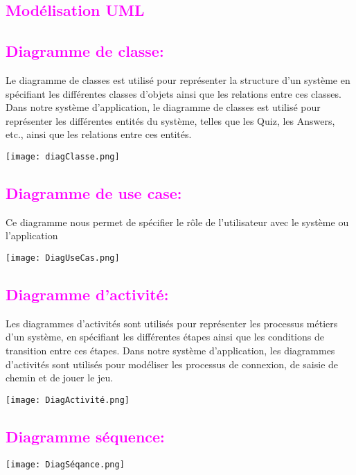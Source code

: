 \documentclass[12pt, a4paper]{report}
\begin{document}
\textcolor{magenta}{\section{ Modélisation UML}}
\textcolor{magenta}{\subsection{Diagramme de classe: }}
Le diagramme de classes est utilisé pour représenter la structure d'un système en spécifiant les différentes classes d'objets ainsi que les relations entre ces classes.\\
Dans notre système d’application, le diagramme de classes est utilisé pour représenter les différentes entités du système, telles que les Quiz, les Answers, etc., ainsi que les relations entre ces entités.
\bigskip
\begin{center}
\texttt{[image: diagClasse.png]} 
\end{center}
\textcolor{magenta}{\subsection{Diagramme de use case: }}
Ce diagramme nous permet de spécifier le rôle de l'utilisateur avec le système ou l’application
\bigskip
\begin{center}
\texttt{[image: DiagUseCas.png]} 
\end{center}
\textcolor{magenta}{\subsection{Diagramme d'activité: }}
Les diagrammes d'activités sont utilisés pour représenter les processus métiers d'un système, en spécifiant les différentes étapes ainsi que les conditions de transition entre ces étapes.
Dans notre système d’application, les diagrammes d'activités sont utilisés pour modéliser les processus de connexion, de saisie de chemin et de jouer le jeu.
\bigskip
\begin{center}
\texttt{[image: DiagActivité.png]} 
\end{center}
\textcolor{magenta}{\subsection{Diagramme séquence: }}
\bigskip
\begin{center}
\texttt{[image: DiagSéqance.png]} 
\end{center}
\newpage
\end{document}
